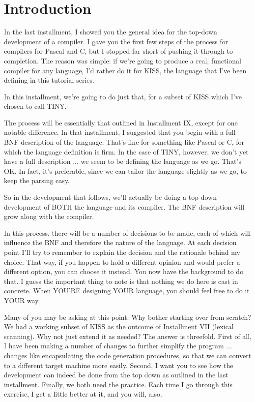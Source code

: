 \documentclass[float=false, crop=false]{standalone}
\begin{document}
\section{Introduction}

In the last installment, I showed you the general idea for the top-down
development of a compiler. I gave you the first few steps of the process for
compilers for Pascal and C, but I stopped far short of pushing it through to
completion. The reason was simple: if we're going to produce a real, functional
compiler for any language, I'd rather do it for KISS, the language that I've
been defining in this tutorial series.

In this installment, we're going to do just that, for a subset of KISS which
I've chosen to call TINY.

The process will be essentially that outlined in Installment IX, except for one
notable difference. In that installment, I suggested that you begin with a full
BNF description of the language. That's fine for something like Pascal or C, for
which the language definition is firm. In the case of TINY, however, we don't
yet have a full description ... we seem to be defining the language as we go.
That's OK. In fact, it's preferable, since we can tailor the language slightly
as we go, to keep the parsing easy.

So in the development that follows, we'll actually be doing a top-down
development of BOTH the language and its compiler. The BNF description will grow
along with the compiler.

In this process, there will be a number of decisions to be made, each of which
will influence the BNF and therefore the nature of the language. At each
decision point I'll try to remember to explain the decision and the rationale
behind my choice. That way, if you happen to hold a different opinion and would
prefer a different option, you can choose it instead. You now have the
background to do that. I guess the important thing to note is that nothing we do
here is cast in concrete. When YOU'RE designing YOUR language, you should feel
free to do it YOUR way.

Many of you may be asking at this point: Why bother starting over from scratch?
We had a working subset of KISS as the outcome of Installment VII (lexical
scanning). Why not just extend it as needed? The answer is threefold. First of
all, I have been making a number of changes to further simplify the program ...
changes like encapsulating the code generation procedures, so that we can
convert to a different target machine more easily. Second, I want you to see how
the development can indeed be done from the top down as outlined in the last
installment. Finally, we both need the practice. Each time I go through this
exercise, I get a little better at it, and you will, also.
\end{document}
